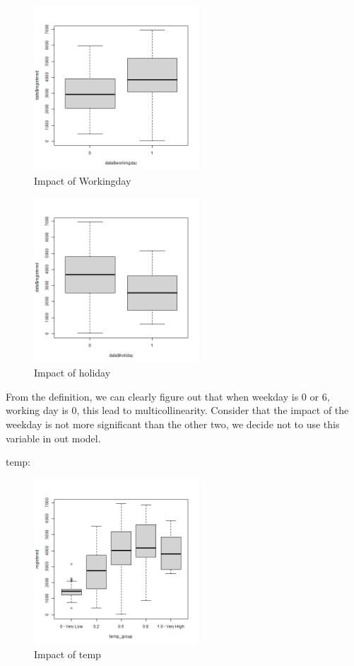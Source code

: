 \begin{figure}[H]
\centering
\includegraphics[width=0.55\textwidth]{img/workingday.png}
\caption{Impact of Workingday}
\label{fig:scaled_revenue_distribution}
\end{figure}

\begin{figure}[H]
\centering
\includegraphics[width=0.55\textwidth]{img/holiday.png}
\caption{Impact of holiday}
\label{fig:scaled_revenue_distribution}
\end{figure}

From the definition, we can clearly figure out that when weekday is 0 or 6, working day is 0, this lead to multicollinearity. Consider that the impact of the weekday is not more significant than the other two, we decide not to use this variable in out model.

temp:
\begin{figure}[H]
\centering
\includegraphics[width=0.55\textwidth]{img/plottemp3.png}
\caption{Impact of temp}
\label{fig:scaled_revenue_distribution}
\end{figure}


